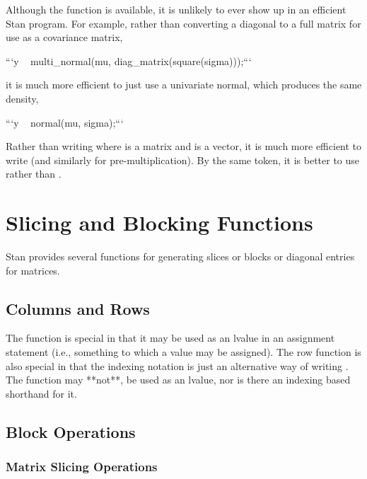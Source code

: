 \begin{description}
{\begin{description}
Although the  function is available, it is unlikely to ever show up in an efficient Stan program.  For example, rather than converting a diagonal to a full matrix for use as a covariance matrix,


```\n y ~ multi_normal(mu, diag_matrix(square(sigma)));\n ```


it is much more efficient to just use a univariate normal, which produces the same density,


```\n y ~ normal(mu, sigma);\n ```


Rather than writing  where  is a matrix and  is a vector, it is much more efficient to write  (and similarly for pre-multiplication). By the same token, it is better to use  rather than .


\section{Slicing and Blocking Functions}


Stan provides several functions for generating slices or blocks or diagonal entries for matrices.


\subsection{Columns and Rows}


\begin{description}   \end{description}


The  function is special in that it may be used as an lvalue in an assignment statement (i.e., something to which a value may be assigned).  The row function is also special in that the indexing notation  is just an alternative way of writing .  The  function may **not**, be used as an lvalue, nor is there an indexing based shorthand for it.


\subsection{Block Operations}


\subsubsection{Matrix Slicing Operations}



\end{description}}
\end{description}
